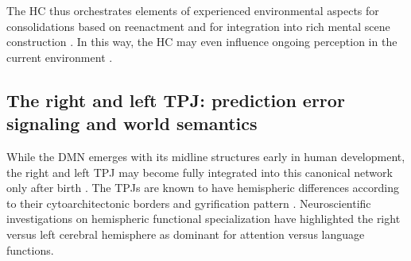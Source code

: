\documentclass[10pt,letterpaper]{article}
\begin{document}
The HC thus orchestrates elements of experienced environmental aspects for
consolidations based on reenactment and for integration into
rich mental scene construction \citep{deuker2016event, bird2010establishing}.
In this way, the HC may even influence
ongoing perception in the current environment
\citep{maguire2016}.


\subsection{The right and left TPJ: prediction error signaling and world semantics}
While the DMN emerges with its midline structures early in human development,
the right and left TPJ may become fully integrated into this canonical
network only after birth \citep{doria2010}.
The TPJs are known to have hemispheric differences
according to their cytoarchitectonic borders and gyrification pattern
\citep{seghier2013angular}.
Neuroscientific investigations on hemispheric functional specialization
have highlighted the right versus left cerebral hemisphere as dominant for
attention versus language functions.
\end{document}
